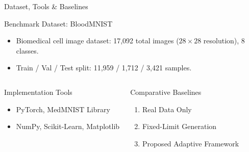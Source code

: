 \documentclass[10pt]{beamer}
\begin{document}
\begin{frame}{Dataset, Tools \& Baselines}
    \begin{block}{Benchmark Dataset: BloodMNIST}
        \begin{itemize}
            \item Biomedical cell image dataset: 17,092 total images ($28 \times 28$ resolution), 8 classes.
            \item Train / Val / Test split: 11,959 / 1,712 / 3,421 samples.
        \end{itemize}
    \end{block}

    \begin{columns}
        \begin{block}{Implementation Tools}
            \begin{itemize}
                \item PyTorch, MedMNIST Library
                \item NumPy, Scikit-Learn, Matplotlib
            \end{itemize}
        \end{block}

        \begin{block}{Comparative Baselines}
            \begin{enumerate}
                \item Real Data Only
                \item Fixed-Limit Generation
                \item Proposed Adaptive Framework
            \end{enumerate}
        \end{block}
    \end{columns}
\end{frame}
\end{document}
